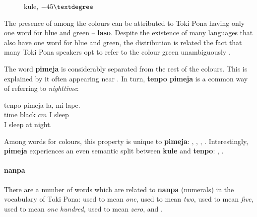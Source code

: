 \documentclass[14pt, a4paper]{extreport}
\makeatletter
\DeclareRobustCommand\ttfamily
        {\not@math@alphabet\ttfamily\mathtt
         \fontfamily\ttdefault\small\selectfont}
\makeatother
\begin{document}
\begin{figure}[ht]%
  \def\angle{-45}
  \bigskip
  \centering
  \caption{kule, \(\angle\textdegree\)}
\end{figure}%

The presence of  among the colours can be attributed to Toki Pona having only one word for blue and green -- \textbf{laso}. Despite the existence of many languages that also have one word for blue and green, the distribution is related the fact that many Toki Pona speakers opt to refer to the colour green unambiguously .

The word \textbf{pimeja} is considerably separated from the rest of the colours. This is explained by it often appearing near . In turn, \textbf{tenpo pimeja} is a common way of referring to \textit{nighttime}:

\begin{exe}
  \ex
  \gll tenpo pimeja la, mi lape. \\
       time black $cm$ I sleep \\
  \glt I sleep at night.
\end{exe}

Among words for colours, this property is unique to \textbf{pimeja}: , , , . Interestingly, \textbf{pimeja} experiences an even semantic split between \textbf{kule} and \textbf{tenpo}: , .
        \paragraph{nanpa}
There are a number of words which are related to \textbf{nanpa} (numerals) in the vocabulary of Toki Pona:  used to mean \textit{one},  used to mean \textit{two},  used to mean \textit{five},  used to mean \textit{one hundred},  used to mean \textit{zero}, and .
\end{document}
